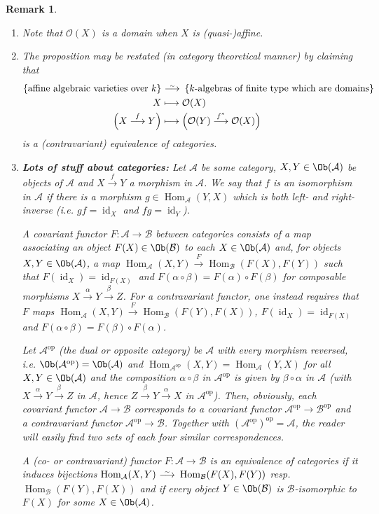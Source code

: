 \documentclass[DIV=14,parskip=full,pointednumbers]{scrartcl}
\newenvironment{alphanumerate}{\begin{enumerate}[label={\upshape(\alph*)},ref=\curthm]}{\end{enumerate}}
\theoremstyle{cthm}
\theoremstyle{cvarthm}
\theoremstyle{cdef}
\newtheorem*{rem*}{Remark}
\newcommand{\Aa}{\mathcal{A}}
\newcommand{\Bb}{\mathcal{B}}
\newcommand{\Oo}{\mathcal{O}}
\newcommand{\Hom}{\operatorname{Hom}}
\newcommand{\id}{\operatorname{id}}
\newcommand{\op}{^{\operatorname{op}}}
\newcommand{\longto}{\longrightarrow}
\newcommand{\isomorphism}{
	\tikz[baseline=(a.base)] \node (a) at (0,0) {$\longrightarrow$} node[above=-0.25ex] {\tiny $\sim$};}
\newcommand{\morphism}[1][]{\overset{#1}{\longto}}
\begin{document}
	\begin{rem*}
		\begin{alphanumerate}
			\item Note that $\Oo(X)$ is a domain when $X$ is (quasi-)affine.
			\item The proposition may be restated (in category theoretical manner) by claiming that
			\begin{align*}
				\left\{\text{affine algebraic varieties}\text{ over }k\right\}&\isomorphism\left\{k\text{-algebras of finite type which are domains}\right\}\\
				X&\longmapsto \Oo(X)\\
				\left(X\morphism[f]Y\right)&\longmapsto \left(\Oo(Y)\morphism[f^*]\Oo(X)\right)
			\end{align*}
			is a (contravariant) \emph{equivalence of categories}.
			\item \textbf{Lots of stuff about categories:} Let $\Aa$ be some category, $X,Y\in\Ob(\Aa)$ be objects of $\Aa$ and $X\morphism[f]Y$ a morphism in $\Aa$. We say that $f$ is an \emph{isomorphism} in $\Aa$ if there is a morphism $g\in\Hom_\Aa(Y,X)$ which is both left- and right-inverse (i.e. $gf=\id_X$ and $fg=\id_Y$).
			
			A \emph{covariant functor} $F\colon\Aa\to\Bb$ between categories consists of a map associating an object $F(X)\in\Ob(\Bb)$ to each $X\in\Ob(\Aa)$ and, for objects $X,Y\in\Ob(\Aa)$, a map $\Hom_\Aa(X,Y)\morphism[F]\Hom_\Bb(F(X),F(Y))$ such that $F(\id_X)=\id_{F(X)}$ and $F(\alpha\circ\beta)=F(\alpha)\circ F(\beta)$ for composable morphisms $X\morphism[\alpha]Y\morphism[\beta]Z$. For a \emph{contravariant functor}, one instead requires that $F$ maps $\Hom_\Aa(X,Y)\morphism[F]\Hom_\Bb(F(Y),F(X))$, $F(\id_X)=\id_{F(X)}$ and $F(\alpha\circ\beta)=F(\beta)\circ F(\alpha)$.
			
			Let $\Aa\op$ (the \emph{dual} or \emph{opposite} category) be $\Aa$ with every morphism reversed, i.e. $\Ob(\Aa\op)=\Ob(\Aa)$ and $\Hom_{\Aa\op}(X,Y)=\Hom_\Aa(Y,X)$ for all $X,Y\in\Ob(\Aa)$ and the composition $\alpha\circ\beta$ in $\Aa\op$ is given by $\beta\circ\alpha$ in $\Aa$ (with $X\morphism[\alpha]Y\morphism[\beta]Z$ in $\Aa$, hence $Z\morphism[\beta]Y\morphism[\alpha]X$ in $\Aa\op$). Then, obviously, each covariant functor $\Aa\to\Bb$ corresponds to a covariant functor $\Aa\op\to\Bb\op$ and a contravariant functor $\Aa\op\to\Bb$. Together with $(\Aa\op)\op=\Aa$, the reader will easily find two sets of each four similar correspondences.
			
			A (co- or contravariant) functor $F\colon\Aa\to\Bb$ is an \emph{equivalence of categories} if it induces bijections $\Hom_\Aa(X,Y)\isomorphism\Hom_\Bb(F(X),F(Y))$ resp. $\Hom_\Bb(F(Y),F(X))$ and if every object $Y\in\Ob(\Bb)$ is $\Bb$-isomorphic to $F(X)$ for some $X\in\Ob(\Aa)$.
			

\end{alphanumerate}
\end{rem*}
\end{document}
